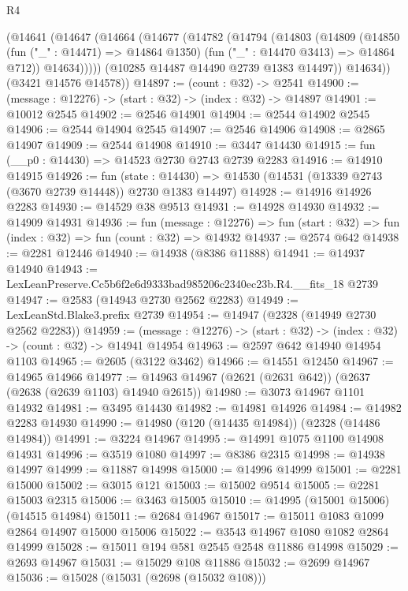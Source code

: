 \begin{lexlean}{R4}
\begin{coremodule}
      (@14641
        (@14647
          (@14664
            (@14677
              (@14782
                (@14794
                  (@14803
                    (@14809
                      (@14850
                        (fun ("_" : @14471) => @14864 @1350)
                        (fun ("_" : @14470 @3413) => @14864 @712))
                      @14634)))))
            (@10285 @14487 @14490 @2739 @1383 @14497))
          @14634))
      (@3421 @14576 @14578))
@14897 := (count : @32) -> @2541
@14900 := (message : @12276) -> (start : @32) -> (index : @32) -> @14897
@14901 := @10012 @2545
@14902 := @2546 @14901
@14904 := @2544 @14902 @2545
@14906 := @2544 @14904 @2545
@14907 := @2546 @14906
@14908 := @2865 @14907
@14909 := @2544 @14908
@14910 := @3447 @14430
@14915 := fun (__p0 : @14430) => @14523 @2730 @2743 @2739 @2283
@14916 := @14910 @14915
@14926 := fun (state : @14430) =>
  @14530 (@14531 (@13339 @2743 (@3670 @2739 @14448)) @2730 @1383 @14497)
@14928 := @14916 @14926 @2283
@14930 := @14529 @38 @9513
@14931 := @14928 @14930
@14932 := @14909 @14931
@14936 := fun (message : @12276) =>
  fun (start : @32) => fun (index : @32) => fun (count : @32) => @14932
@14937 := @2574 @642
@14938 := @2281 @12446
@14940 := @14938 (@8386 @11888)
@14941 := @14937 @14940
@14943 := LexLeanPreserve.Cc5b6f2e6d9333bad985206c2340ec23b.R4.__fits_18 @2739
@14947 := @2583 (@14943 @2730 @2562 @2283)
@14949 := LexLeanStd.Blake3.prefix @2739
@14954 := @14947 (@2328 (@14949 @2730 @2562 @2283))
@14959 := (message : @12276) -> (start : @32) -> (index : @32) -> (count : @32) -> @14941 @14954
@14963 := @2597 @642 @14940 @14954 @1103
@14965 := @2605 (@3122 @3462)
@14966 := @14551 @12450
@14967 := @14965 @14966
@14977 := @14963 @14967 (@2621 (@2631 @642)) (@2637 (@2638 (@2639 @1103) @14940 @2615))
@14980 := @3073 @14967 @1101 @14932
@14981 := @3495 @14430
@14982 := @14981 @14926
@14984 := @14982 @2283 @14930
@14990 := @14980 (@120 (@14435 @14984)) (@2328 (@14486 @14984))
@14991 := @3224 @14967
@14995 := @14991 @1075 @1100 @14908 @14931
@14996 := @3519 @1080
@14997 := @8386 @2315
@14998 := @14938 @14997
@14999 := @11887 @14998
@15000 := @14996 @14999
@15001 := @2281 @15000
@15002 := @3015 @121
@15003 := @15002 @9514
@15005 := @2281 @15003 @2315
@15006 := @3463 @15005
@15010 := @14995 (@15001 @15006) (@14515 @14984)
@15011 := @2684 @14967
@15017 := @15011 @1083 @1099 @2864 @14907 @15000 @15006
@15022 := @3543 @14967 @1080 @1082 @2864 @14999
@15028 := @15011 @194 @581 @2545 @2548 @11886 @14998
@15029 := @2693 @14967
@15031 := @15029 @108 @11886
@15032 := @2699 @14967
@15036 := @15028 (@15031 (@2698 (@15032 @108)))

\end{coremodule}
\end{lexlean}
